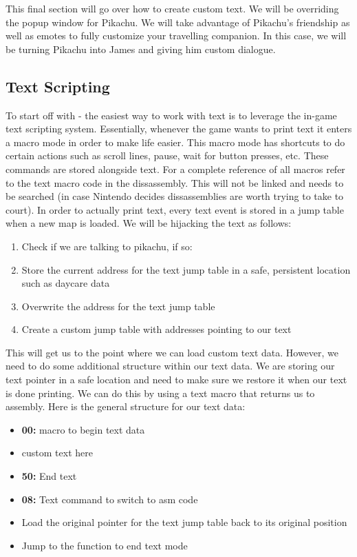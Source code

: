 \documentclass[../main.tex]{subfiles}
\begin{document}
    This final section will go over how to create custom text.  We will be overriding the popup window for Pikachu.  We will take advantage of Pikachu's friendship as well as emotes to fully customize your travelling companion.  In this case, we will be turning Pikachu into James and giving him custom dialogue.

    \subsection{Text Scripting}
    To start off with - the easiest way to work with text is to leverage the in-game text scripting system.  Essentially, whenever the game wants to print text it enters a macro mode in order to make life easier.  This macro mode has shortcuts to do certain actions such as scroll lines, pause, wait for button presses, etc.  These commands are stored alongside text.  For a complete reference of all macros refer to the text macro code in the dissassembly.  This will not be linked and needs to be searched (in case Nintendo decides dissassemblies are worth trying to take to court).  In order to actually print text, every text event is stored in a jump table when a new map is loaded.  We will be hijacking the text as follows:

    \begin{enumerate}
        \item Check if we are talking to pikachu, if so:
        \item Store the current address for the text jump table in a safe, persistent location such as daycare data
        \item Overwrite the address for the text jump table
        \item Create a custom jump table with addresses pointing to our text
    \end{enumerate}

    This will get us to the point where we can load custom text data.  However, we need to do some additional structure within our text data.  We are storing our text pointer in a safe location and need to make sure we restore it when our text is done printing.  We can do this by using a text macro that returns us to assembly.  Here is the general structure for our text data:

    \begin{itemize}
        \item \textbf{00:} macro to begin text data
        \item custom text here
        \item \textbf{50:} End text
        \item \textbf{08:} Text command to switch to asm code
        \item Load the original pointer for the text jump table back to its original position
        \item Jump to the function to end text mode
    \end{itemize}
\end{document}
